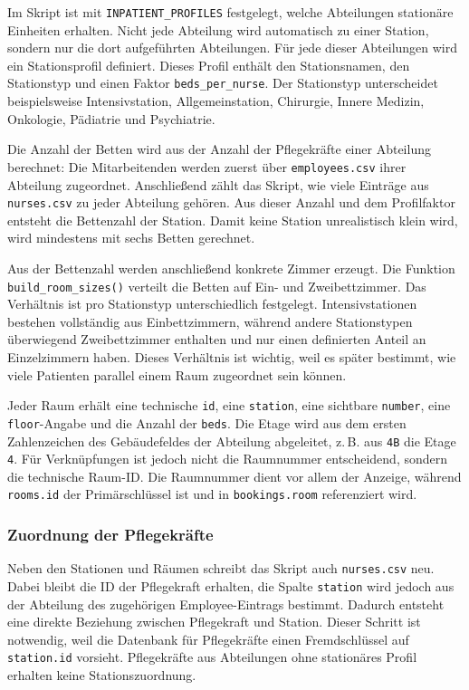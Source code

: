 Im Skript ist mit \texttt{INPATIENT\_PROFILES} festgelegt, welche Abteilungen stationäre
Einheiten erhalten. Nicht jede Abteilung wird automatisch zu einer Station, sondern nur die dort
aufgeführten Abteilungen. Für jede dieser Abteilungen wird ein Stationsprofil definiert. Dieses
Profil enthält den Stationsnamen, den Stationstyp und einen Faktor \texttt{beds\_per\_nurse}.
Der Stationstyp unterscheidet beispielsweise Intensivstation, Allgemeinstation, Chirurgie,
Innere Medizin, Onkologie, Pädiatrie und Psychiatrie.

Die Anzahl der Betten wird aus der Anzahl der Pflegekräfte einer Abteilung berechnet:
Die Mitarbeitenden werden zuerst über \texttt{employees.csv} ihrer Abteilung zugeordnet.
Anschließend zählt das Skript, wie viele Einträge aus \texttt{nurses.csv} zu jeder Abteilung
gehören. Aus dieser Anzahl und dem Profilfaktor entsteht die Bettenzahl der Station. Damit keine
Station unrealistisch klein wird, wird mindestens mit sechs Betten gerechnet.

Aus der Bettenzahl werden anschließend konkrete Zimmer erzeugt. Die Funktion
\texttt{build\_room\_sizes()} verteilt die Betten auf Ein- und Zweibettzimmer. Das Verhältnis ist
pro Stationstyp unterschiedlich festgelegt. Intensivstationen bestehen vollständig aus
Einbettzimmern, während andere Stationstypen überwiegend Zweibettzimmer enthalten und nur einen
definierten Anteil an Einzelzimmern haben. Dieses Verhältnis ist wichtig, weil es später bestimmt,
wie viele Patienten parallel einem Raum zugeordnet sein können.

Jeder Raum erhält eine technische \texttt{id}, eine \texttt{station}, eine sichtbare
\texttt{number}, eine \texttt{floor}-Angabe und die Anzahl der \texttt{beds}. Die Etage wird aus
dem ersten Zahlenzeichen des Gebäudefeldes der Abteilung abgeleitet, z.\,B. aus \texttt{4B} die
Etage \texttt{4}. Für Verknüpfungen ist jedoch nicht die Raumnummer entscheidend, sondern die
technische Raum-ID. Die Raumnummer dient vor allem der Anzeige, während \texttt{rooms.id} der
Primärschlüssel ist und in \texttt{bookings.room} referenziert wird.

\subsubsection*{Zuordnung der Pflegekräfte}

Neben den Stationen und Räumen schreibt das Skript auch \texttt{nurses.csv} neu. Dabei bleibt die
ID der Pflegekraft erhalten, die Spalte \texttt{station} wird jedoch aus der Abteilung des
zugehörigen Employee-Eintrags bestimmt. Dadurch entsteht eine direkte Beziehung zwischen
Pflegekraft und Station. Dieser Schritt ist notwendig, weil die Datenbank für Pflegekräfte einen
Fremdschlüssel auf \texttt{station.id} vorsieht. Pflegekräfte aus Abteilungen ohne stationäres
Profil erhalten keine Stationszuordnung.

